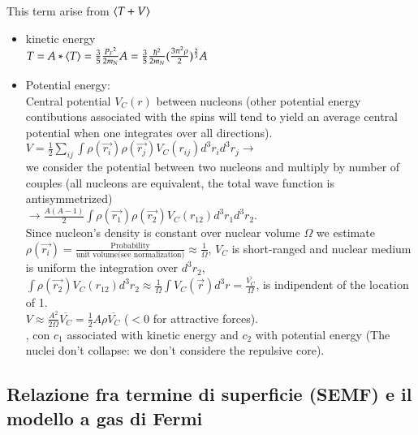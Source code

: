 \documentclass[main.tex]{subfiles}
\begin{document}
This term arise from $\langle T+V \rangle$\\
\begin{itemize}
\item kinetic energy\\
$T=A*\langle T \rangle=\frac{3}{5}\frac{{P_F}^2}{2m_N}A=\frac{3}{5}\frac{\hbar^2}{2m_N}(\frac{3\pi^2\rho}{2})^{\frac{2}{3}}A$
\item Potential energy:\\
Central potential $V_C(r)$ between nucleons (other potential energy contibutions associated with the spins will tend to yield an average central potential when one integrates over all directions).\\
$V=\frac{1}{2}\sum_{ij}\int\rho(\vec{r_i})\rho(\vec{r_j})V_C(r_{ij})d^3r_id^3r_j\rightarrow$\\
we consider the potential between two nucleons and multiply by number of couples (all nucleons are equivalent, the total wave function is antisymmetrized)\\
$\rightarrow\frac{A(A-1)}{2}\int\rho(\vec{r_1})\rho(\vec{r_2})V_C(r_{12})d^3r_1d^3r_2$.\\
Since nucleon's density is constant over nuclear volume  $\Omega$ we estimate $\rho(\vec{r_i})=\frac{\text{Probability}}{\text{unit volume(see normalization)}}\approx\frac{1}{\Omega}$, $V_C$ is short-ranged and nuclear medium is uniform  the integration over $d^3r_2$,  $\int\rho(\vec{r_2})V_C(r_{12})d^3r_2\approx\frac{1}{\Omega}\int V_C(\vec{r})d^3r=\frac{\overline{V_C}}{\Omega}$, is indipendent of the location of 1.\\
 $V\approx\frac{A^2}{2\Omega}\overline{V_C}=\frac{1}{2}A\rho\overline{V_C} $ ($<0$ for attractive forces).\\
, con $c_1$ associated with kinetic energy and $c_2$ with potential energy (The nuclei don't collapse: we don't considere the repulsive core).
\end{itemize}

\subsection{Relazione fra termine di superficie (SEMF) e il modello a gas di Fermi}
\end{document}
